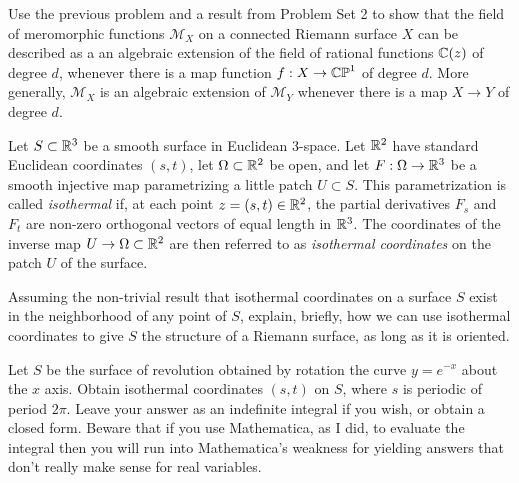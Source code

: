 \documentclass[expanded]{lkx_pset}
\begin{document}
\begin{problem}{3}
Use the previous problem and a result from Problem Set 2 to show that
the field of meromorphic functions $\mathcal{M}_{X}$ on a connected
Riemann surface $X$ can be described as a an algebraic extension of
the field of rational functions $\mathbb{C}(z)$ of degree  $d$,
whenever there is a map function $f:X\to \mathbb{CP}^{1}$ of degree $d$.
More generally, $\mathcal{M}_{X}$ is an algebraic extension of
$\mathcal{M}_{Y}$ whenever there is a map $X\to Y$ of degree $d$.
\end{problem}

\begin{solution}
\end{solution}

\begin{problem}{4}
Let $S\subset \mathbb{R}^{3}$ be a smooth surface in Euclidean 3-space.
Let $\mathbb{R}^{2}$ have standard Euclidean coordinates $(s,t)$, let
$\Omega\subset \mathbb{R}^{2}$ be open, and let $F:\Omega\to \mathbb{R}^{3}$ be a
smooth injective map parametrizing a little patch $U \subset S$. This
parametrization is called \emph{isothermal} if, at each point $z =(s,t) \in \mathbb{R}^{2}$,
the partial derivatives $F_{s}$ and $F_{t}$ are non-zero orthogonal
vectors of equal length in $\mathbb{R}^{3}$. The coordinates of the inverse map $U\to
	\Omega\subset \mathbb{R}^{2}$ are then referred to as \emph{isothermal coordinates} on the patch $U$ of the surface.
\end{problem}

\begin{parts}
	\begin{part}{}
		Assuming the non-trivial
		result that isothermal coordinates on a surface $S$ exist in the
		neighborhood of any point of $S$, explain, briefly, how we
		can use isothermal coordinates to give $S$ the structure of a Riemann
		surface, as long as it is oriented.
	\end{part}

	\begin{part}{}
		Let $S$ be the surface of revolution obtained by rotation the curve
		$y=e^{-x}$ about the $x$ axis. Obtain isothermal
		coordinates $(s,t)$ on $S$, where $s$ is periodic of period $2\pi$.
		Leave your answer as an indefinite integral if you wish, or obtain a
		closed form. Beware that if you use Mathematica, as I did, to evaluate
		the integral then you will run into Mathematica's weakness for
		yielding answers that don't really make sense for real variables.
	\end{part}
\end{parts}
\end{document}
